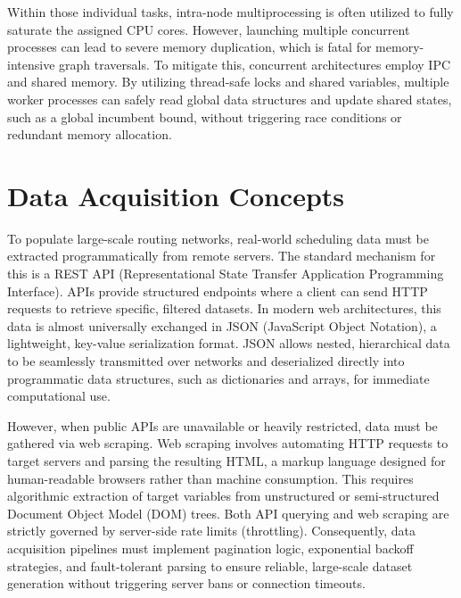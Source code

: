 \medskip

Within those individual tasks, intra-node multiprocessing is often utilized to fully saturate the assigned CPU cores. However, launching multiple concurrent processes can lead to severe memory duplication, which is fatal for memory-intensive graph traversals. To mitigate this, concurrent architectures employ IPC and shared memory. By utilizing thread-safe locks and shared variables, multiple worker processes can safely read global data structures and update shared states, such as a global incumbent bound, without triggering race conditions or redundant memory allocation.

\section{Data Acquisition Concepts}
\label{sec:data_acquisition_concepts}
To populate large-scale routing networks, real-world scheduling data must be extracted programmatically from remote servers. The standard mechanism for this is a REST API (Representational State Transfer Application Programming Interface). APIs provide structured endpoints where a client can send HTTP requests to retrieve specific, filtered datasets. In modern web architectures, this data is almost universally exchanged in JSON (JavaScript Object Notation), a lightweight, key-value serialization format. JSON allows nested, hierarchical data to be seamlessly transmitted over networks and deserialized directly into programmatic data structures, such as dictionaries and arrays, for immediate computational use.

\medskip

However, when public APIs are unavailable or heavily restricted, data must be gathered via web scraping. Web scraping involves automating HTTP requests to target servers and parsing the resulting HTML, a markup language designed for human-readable browsers rather than machine consumption. This requires algorithmic extraction of target variables from unstructured or semi-structured Document Object Model (DOM) trees. Both API querying and web scraping are strictly governed by server-side rate limits (throttling). Consequently, data acquisition pipelines must implement pagination logic, exponential backoff strategies, and fault-tolerant parsing to ensure reliable, large-scale dataset generation without triggering server bans or connection timeouts.